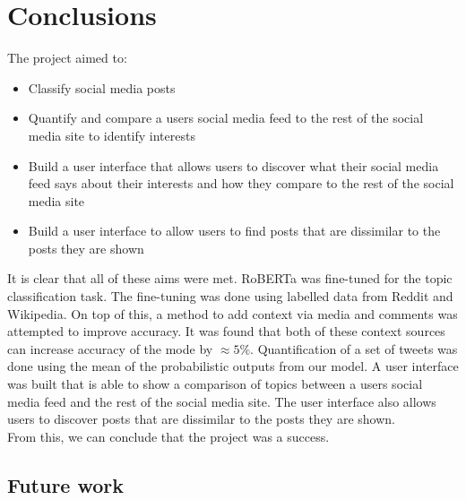 \chapter{Conclusions}
\label{ch:conclusions}

The project aimed to:
\begin{itemize}
    \item Classify social media posts
    \item Quantify and compare a users social media feed to the rest of the social media site to identify interests
    \item Build a user interface that allows users to discover what their social media feed says about their interests and how they compare to the rest of the social media site
    \item Build a user interface to allow users to find posts that are dissimilar to the posts they are shown
\end{itemize}

It is clear that all of these aims were met. RoBERTa was fine-tuned for the topic classification task. The fine-tuning was done
using labelled data from Reddit and Wikipedia. On top of this, a method to add context via media and comments was attempted to improve
accuracy. It was found that both of these context sources can increase accuracy of the mode by $\approx 5\%$.
Quantification of a set of tweets was done using the mean of the probabilistic outputs
from our model. A user interface was built that is able to show a comparison of topics between a users social media feed and the rest
of the social media site. The user interface also allows users to discover posts that are dissimilar to the posts they are shown.\\
From this, we can conclude that the project was a success.
\section{Future work}
